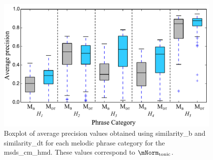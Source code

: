 \begin{figure}
	\begin{center}
		\includegraphics[width=\figSizeNinety]{ch06_patterns/figures/ImprovingSimilarity/HindustaniPerCategoryPerformance_BOXPLOT.pdf}
	\end{center}
	\caption[Boxplot of average precision for different types of melodic patterns in the Hindustani music dataset]{Boxplot of average precision values obtained using \acrshort{similarity_b} and \acrshort{similarity_dt} for each melodic phrase category for the \acrshort{msds_cm_hmd}. These values correspond to $\mNorm_\mathrm{tonic}$.} 
	\label{fig:hinudstaniPerCategoryPerformance}
\end{figure}


